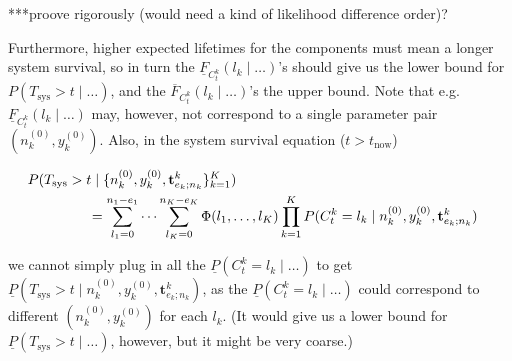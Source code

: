 \documentclass[Journal,SectionNumbers,SingleSpace,InsideFigs]{ascelike}
\newcommand{\mbf}[1]{\mathbf{#1}}
\newcommand{\uz}{^{(0)}} %
\newcommand{\ul}[1]{\underline{#1}}
\newcommand{\ol}[1]{\overline{#1}}
\def\Tsys{T_\text{sys}}
\def\ykz{y\uz_k}
\def\nkz{n\uz_k}
\def\tnow{t_\text{now}}
\begin{document}
***proove rigorously (would need a kind of likelihood difference order)?

Furthermore, higher expected lifetimes for the components must mean
a longer system survival, so in turn the $\ul{F}_{C^k_t}(l_k \mid \ldots)$'s
should give us the lower bound for $P(\Tsys > t\mid\ldots)$,
and the $\ol{F}_{C^k_t}(l_k \mid \ldots)$'s the upper bound.
Note that e.g.\ $\ul{F}_{C^k_t}(l_k \mid \ldots)$ may, however, not correspond to a single parameter pair $(\nkz, \ykz)$.
Also, in the system survival equation ($t > \tnow$)
\begin{linenomath*}
\begin{align} \label{eq:25}
\lefteqn{%
P(\Tsys > t\mid\{\nkz,\ykz, \mbf{t}^k_{e_k;n_k}\}_{k=1}^K)} \hspace*{10ex}\nonumber\\ 
 &= \sum_{l_1=0}^{n_1-e_1} \cdots \sum_{l_K=0}^{n_K-e_K} \Phi(l_1,\ldots,l_K) \prod_{k=1}^K
    P(C^k_t = l_k\mid\nkz,\ykz, \mbf{t}^k_{e_k;n_k})
\end{align}
\end{linenomath*}
we cannot simply plug in all the $\ul{P}(C^k_t = l_k\mid \ldots)$ %
to get $\ul{P}(\Tsys > t\mid\nkz,\ykz, \mbf{t}^k_{e_k;n_k})$, %
as the $\ul{P}(C^k_t = l_k\mid \ldots)$ could correspond to different $(\nkz,\ykz)$ for each $l_k$.
(It would give us a lower bound for $\ul{P}(\Tsys > t\mid\ldots)$, however, but it might be very coarse.)
\end{document}

